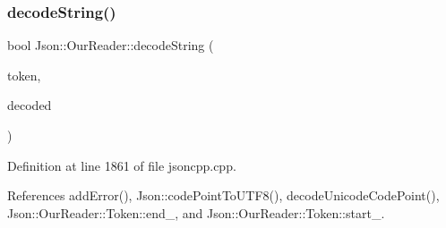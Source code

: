 \subsubsection{\texorpdfstring{decode\+String()}{decodeString()}\hspace{0.1cm}{\footnotesize\ttfamily [2/2]}}
{\footnotesize\ttfamily bool Json\+::\+Our\+Reader\+::decode\+String (\begin{DoxyParamCaption}\item[{\hyperlink{class_json_1_1_our_reader_1_1_token}{Token} \&}]{token,  }\item[{\hyperlink{json_8h_a1e723f95759de062585bc4a8fd3fa4be}{J\+S\+O\+N\+C\+P\+P\+\_\+\+S\+T\+R\+I\+NG} \&}]{decoded }\end{DoxyParamCaption})\hspace{0.3cm}{\ttfamily [private]}}



Definition at line 1861 of file jsoncpp.\+cpp.



References add\+Error(), Json\+::code\+Point\+To\+U\+T\+F8(), decode\+Unicode\+Code\+Point(), Json\+::\+Our\+Reader\+::\+Token\+::end\+\_\+, and Json\+::\+Our\+Reader\+::\+Token\+::start\+\_\+.


